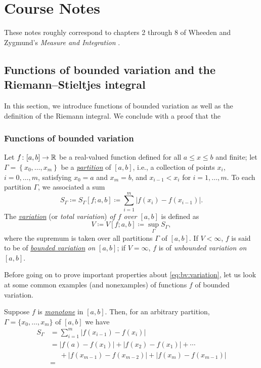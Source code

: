 \chapter{Course Notes}
These notes roughly correspond to chapters 2 through 8 of Wheeden and
Zygmund's \emph{Measure and Integration}
\cite{wheeden-zygmund:measure-and-integral}.

\section{Functions of bounded variation and the Riemann--Stieltjes
  integral}
In this section, we introduce functions of bounded variation as well as the
definition of the Riemann integral. We conclude with a proof that the

\subsection{Functions of bounded variation}
Let $f\colon[a,b]\to\mathbb{R}$ be a real-valued function defined for all $a\leq
x\leq b$ and finite; let $\Gamma=\left\{x_0,\dotsc,x_m\right\}$ be a
\href{https://en.wikipedia.org/wiki/Partition_of_an_interval}{\emph{partition}}
of $[a,b]$, i.e., a collection of points $x_i$, $i=0,\dotsc,m$, satisfying
$x_0=a$ and $x_m=b$, and $x_{i-1}<x_i$ for $i=1,\dotsc,m$. To each
partition $\Gamma$, we associated a sum
\begin{equation}
\label{eq:bv:sum}
S_\Gamma\coloneqq S_\Gamma[f;a,b]\coloneqq\sum_{i=1}^m\left|f(x_i)-f(x_{i-1})\right|.
\end{equation}
The
\href{https://en.wikipedia.org/wiki/Bounded_variation#Formal_definition}{\emph{variation}}
(or \emph{total variation}) \emph{of $f$ over $[a,b]$} is defined as
\begin{equation}
  \label{eq:bv:variation}
V\coloneqq V[f;a,b]\coloneqq\sup_\Gamma S_\Gamma,
\end{equation}
where the supremum is taken over all partitions $\Gamma$ of $[a,b]$. If
$V<\infty$, $f$ is said to be of
\href{https://en.wikipedia.org/wiki/Bounded_variation}{\emph{bounded
    variation}} \emph{on $[a,b]$}; if $V=\infty$, $f$ is of \emph{unbounded
variation on $[a,b]$}.

Before going on to prove important properties about
\eqref{eq:bv:variation}, let us look at some common examples (and
nonexamples) of functions $f$ of bounded variation.

\begin{example}
Suppose $f$ is
\href{https://en.wikipedia.org/wiki/Monotonic_function}{\emph{monotone}} in
$[a,b]$. Then, for an arbitrary partition, $\Gamma=\{x_0,\dotsc,x_m\}$ of
$[a,b]$ we have
\begin{align*}
S_\Gamma&=\sum_{i=1}^m|f(x_{i-1})-f(x_i)|\\
        &=|f(a)-f(x_1)|+|f(x_2)-f(x_1)|+\dotsb\\
        &\phantom{{}={}}+|f(x_{m-1})-f(x_{m-2})|+|f(x_m)-f(x_{m-1})|\\
        &=
\end{align*}
\end{example}

